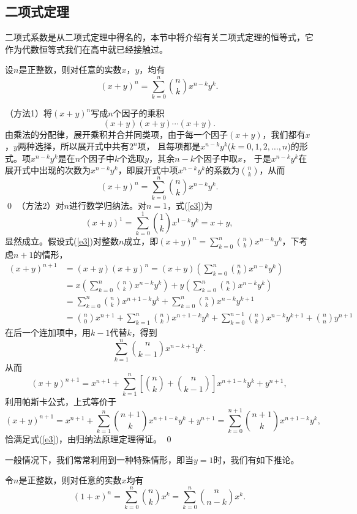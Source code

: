 \subsection{二项式定理}
二项式系数是从二项式定理中得名的，本节中将介绍有关二项式定理的恒等式，它作为代数恒等式我们在高中就已经接触过。
\begin{thm}
设$n$是正整数，则对任意的实数$x$，$y$，均有
\begin{equation}\label{e3}
(x+y)^n=\sum_{k=0}^n{n\choose k}x^{n-k}y^k.
\end{equation}
\end{thm}
（方法1）将$(x+y)^n$写成$n$个因子的乘积$$(x+y)(x+y)\cdots(x+y).$$
由乘法的分配律，展开乘积并合并同类项，由于每一个因子$(x+y)$，我们都有$x$，$y$两种选择，所以展开式中共有$2^n$项，
且每项都是$x^{n-k}y^k$($k=0,1,2,\ldots,n$)的形式。项$x^{n-k}y^k$是在$n$个因子中$k$个选取$y$，其余$n-k$个因子中取$x$，
于是$x^{n-k}y^k$在展开式中出现的次数为$x^{n-k}y^k$，即展开式中项$x^{n-k}y^k$的系数为${n\choose
k}$，从而
$$(x+y)^n=\sum_{k=0}^n{n\choose k}x^{n-k}y^k.$$
\qed
{}（方法2）对$n$进行数学归纳法。对$n=1$，式(\ref{e3})为$$(x+y)^1=\sum_{k=0}^1{1\choose
k}x^{1-k}y^k=x+y,$$
显然成立。假设式(\ref{e3})对整数$n$成立，即$(x+y)^n=\sum_{k=0}^n{n\choose
k}x^{n-k}y^k$，下考虑$n+1$的情形，
\begin{align*}
(x+y)^{n+1}&=(x+y)(x+y)^n=(x+y)\left(\sum_{k=0}^n{n\choose k}x^{n-k}y^k\right)\\
&=x\left(\sum_{k=0}^n{n\choose k}x^{n-k}y^k\right)+y\left(\sum_{k=0}^n{n\choose k}x^{n-k}y^k\right)\\
&=\sum_{k=0}^n{n\choose k}x^{n+1-k}y^k+\sum_{k=0}^n{n\choose k}x^{n-k}y^{k+1}\\
&={n\choose 0}x^{n+1}+\sum_{k=1}^n{n\choose
k}x^{n+1-k}y^{k}+\sum_{k=0}^{n-1}{n\choose
k}x^{n-k}y^{k+1}+{n\choose n}y^{n+1}
\end{align*}
在后一个连加项中，用$k-1$代替$k$，得到
$$\sum_{k=1}^n{n\choose k-1}x^{n-k+1}y^k.$$
从而$$(x+y)^{n+1}=x^{n+1}+\sum_{k=1}^n\left[{n\choose k}+{n\choose
k-1}\right]x^{n+1-k}y^k+y^{n+1},$$
利用帕斯卡公式，上式等价于$$(x+y)^{n+1}=x^{n+1}+\sum_{k=1}^n{n+1\choose
k}x^{n+1-k}y^k+y^{n+1}=\sum_{k=0}^{n+1}{n+1\choose
k}x^{n+1-k}y^k,$$恰满足式(\ref{e3})，由归纳法原理定理得证。 \qed

一般情况下，我们常常利用到一种特殊情形，即当$y=1$时，我们有如下推论。
\begin{coro}
令$n$是正整数，则对任意的实数$x$均有$$(1+x)^n=\sum_{k=0}^n{n\choose
k}x^k=\sum_{k=0}^n{n\choose n-k}x^k.$$
\end{coro}

